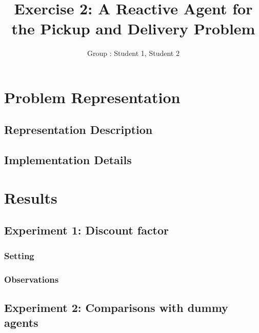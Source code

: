 \documentclass[11pt]{article}
\title{\bf Exercise 2: A Reactive Agent for the Pickup and Delivery Problem}
\author{Group \textnumero: Student 1, Student 2}
\begin{document}
\maketitle

\section{Problem Representation}

\subsection{Representation Description}

\subsection{Implementation Details}

\section{Results}

\subsection{Experiment 1: Discount factor}

\subsubsection{Setting}

\subsubsection{Observations}

\subsection{Experiment 2: Comparisons with dummy agents}
\end{document}
